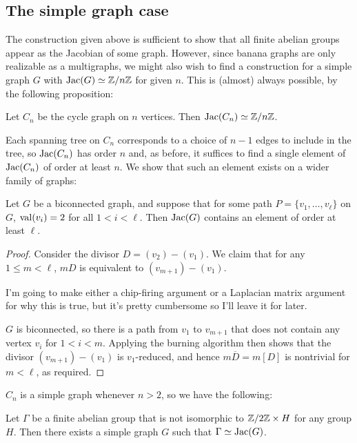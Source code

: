 \documentclass{amsart}
\begin{document}
\subsection{The simple graph case}
The construction given above is sufficient to show that all finite
abelian groups appear as the Jacobian of some graph. However, since
banana graphs are only realizable as a multigraphs, we might also wish
to find a construction for a simple graph $G$ with $\operatorname{Jac}(G) \simeq
\mathbb{Z}/n\mathbb{Z}$ for given $n$. This is (almost) always possible, by the
following proposition:

\begin{prop}
  \label{prop:cycle_cyclic}
  Let $C_n$ be the cycle graph on $n$ vertices. Then $\operatorname{Jac}(C_n) \simeq
  \mathbb{Z}/n\mathbb{Z}$.
\end{prop}

Each spanning tree on $C_n$ corresponds to a choice of $n-1$ edges to
include in the tree, so $\operatorname{Jac}(C_n)$ has order $n$ and, as before, it
suffices to find a single element of $\operatorname{Jac}(C_n)$ of order at least
$n$. We show that such an element exists on a wider family of graphs:

\begin{lem}
  \label{lem:2valent_path}
  Let $G$ be a biconnected graph, and suppose that for some path $P =
  \{v_1, \ldots, v_\ell\}$ on $G$, $\operatorname{val}(v_i) = 2$ for all $1 < i <
  \ell$. Then $\operatorname{Jac}(G)$ contains an element of order at least $\ell$.
\end{lem}
\begin{proof}
  Consider the divisor $D = (v_2) - (v_1)$. We claim that for any $1
  \le m < \ell$, $mD$ is equivalent to $(v_{m+1}) - (v_1)$.

  I'm going to make either a chip-firing argument or a Laplacian
  matrix argument for why this is true, but it's pretty cumbersome so
  I'll leave it for later.

  $G$ is biconnected, so there is a path from $v_1$ to $v_{m+1}$ that
  does not contain any vertex $v_i$ for $1 < i < m$. Applying the
  burning algorithm then shows that the divisor $(v_{m+1}) - (v_1)$ is
  $v_1$-reduced, and hence $m\overline{D} = m[D]$ is nontrivial for $m
  < \ell$, as required.
\end{proof}

$C_n$ is a simple graph whenever $n > 2$, so we have the following:

\begin{cor}
  Let $\Gamma$ be a finite abelian group that is not isomorphic to
  $\mathbb{Z}/2\mathbb{Z} \times H$ for any group $H$. Then there exists a simple
  graph $G$ such that $\Gamma \simeq \operatorname{Jac}(G)$.
\end{cor}
\end{document}
